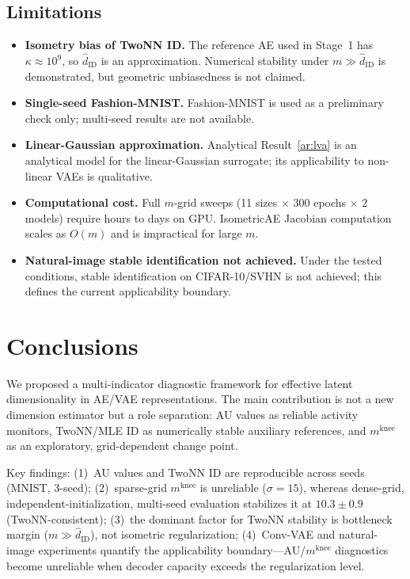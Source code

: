 \documentclass[make,article,submit,pdftex,moreauthors]{Definitions/mdpi}
\newcommand{\kap}{\kappa}
\newcommand{\mknee}{m^{\mathrm{knee}}}
\newcommand{\hatdID}{\hat{d}_{\mathrm{ID}}}
\begin{document}
\subsection{Limitations}\label{sec:disc_limitation}

\begin{itemize}
\item \textbf{Isometry bias of TwoNN ID.}
The reference AE used in Stage~1 has $\kap\approx10^9$, so $\hatdID$ is an
approximation.
Numerical stability under $m\gg\hatdID$ is demonstrated, but geometric
unbiasedness is not claimed.

\item \textbf{Single-seed Fashion-MNIST.}
Fashion-MNIST is used as a preliminary check only; multi-seed results are not
available.

\item \textbf{Linear-Gaussian approximation.}
Analytical Result~\ref{ar:lva} is an analytical model for the linear-Gaussian
surrogate; its applicability to non-linear VAEs is qualitative.

\item \textbf{Computational cost.}
Full $m$-grid sweeps (11 sizes $\times$ 300 epochs $\times$ 2 models) require
hours to days on GPU.
IsometricAE Jacobian computation scales as $O(m)$ and is impractical for large $m$.

\item \textbf{Natural-image stable identification not achieved.}
Under the tested conditions, stable identification on CIFAR-10/SVHN is not
achieved; this defines the current applicability boundary.
\end{itemize}

\section{Conclusions}\label{sec:conclusion}

We proposed a multi-indicator diagnostic framework for effective latent
dimensionality in AE/VAE representations.
The main contribution is not a new dimension estimator but a role separation:
AU values as reliable activity monitors, TwoNN/MLE ID as numerically stable
auxiliary references, and $\mknee$ as an exploratory, grid-dependent change point.

Key findings:
(1)~AU values and TwoNN ID are reproducible across seeds (MNIST, 3-seed);
(2)~sparse-grid $\mknee$ is unreliable ($\sigma=15$), whereas dense-grid,
independent-initialization, multi-seed evaluation stabilizes it at
$10.3\pm0.9$ (TwoNN-consistent);
(3)~the dominant factor for TwoNN stability is bottleneck margin
($m\gg\hatdID$), not isometric regularization;
(4)~Conv-VAE and natural-image experiments quantify the applicability
boundary---AU/$\mknee$ diagnostics become unreliable when decoder capacity
exceeds the regularization level.
\end{document}
